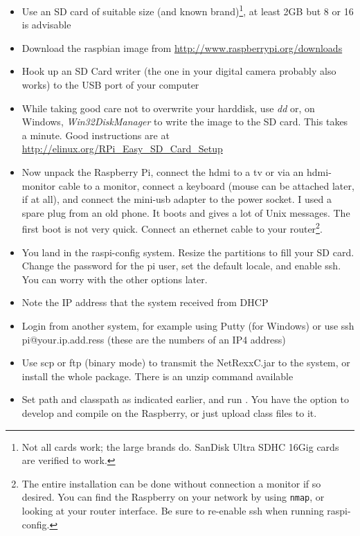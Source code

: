 \begin{itemize}
\item Use an SD card of suitable size (and known brand)\footnote{Not all cards work; the large brands do. SanDisk Ultra SDHC 16Gig cards are verified to work.}, at least 2GB but 8 or 16 is advisable
\item Download the raspbian image from \url{http://www.raspberrypi.org/downloads}
\item Hook up an SD Card writer (the one in your digital camera probably also works) to the USB port of your computer
\item While taking good care not to overwrite your harddisk, use \emph{dd} or, on Windows, \emph{Win32DiskManager} to write the image to the SD card. This takes a minute. Good instructions are at \url{http://elinux.org/RPi_Easy_SD_Card_Setup}
\item Now unpack the Raspberry Pi, connect the hdmi to a tv or via an hdmi-monitor cable to a monitor, connect a keyboard (mouse can be attached later, if at all), and connect the mini-usb adapter to the power socket. I used a spare plug from an old phone. It boots and gives a lot of Unix messages. The first boot is not very quick. Connect an ethernet cable to your router\footnote{The entire installation can be done without connection a monitor if so desired. You can find the Raspberry on your network by using \texttt{nmap}, or looking at your router interface. Be sure to re-enable ssh when running raspi-config.}.
\item You land in the raspi-config system. Resize the partitions to fill your SD card. Change the password for the pi user, set the default locale, and enable ssh. You can worry with the other options later.
\item Note the IP address that the system received from DHCP
\item Login from another system, for example using Putty (for Windows) or use ssh pi@your.ip.add.ress (these are the numbers of an IP4 address)
\item Use scp or ftp (binary mode) to transmit the NetRexxC.jar to the system, or install the whole \nr{} package. There is an unzip command available
\item Set path and classpath as indicated earlier, and run \nr{}. You have the option to develop and compile on the Raspberry, or just upload class files to it.
\end{itemize}
